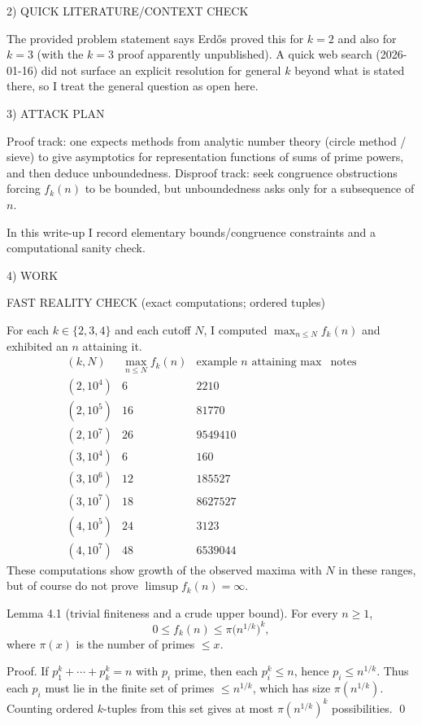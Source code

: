2) QUICK LITERATURE/CONTEXT CHECK

The provided problem statement says Erd\H{o}s proved this for $k=2$ and also for $k=3$ (with the $k=3$ proof apparently unpublished).
A quick web search (2026-01-16) did not surface an explicit resolution for general $k$ beyond what is stated there, so I treat the general question as open here.

3) ATTACK PLAN

Proof track: one expects methods from analytic number theory (circle method / sieve) to give asymptotics for representation functions of sums of prime powers, and then deduce unboundedness.
Disproof track: seek congruence obstructions forcing $f_k(n)$ to be bounded, but unboundedness asks only for a subsequence of $n$.

In this write-up I record elementary bounds/congruence constraints and a computational sanity check.

4) WORK

FAST REALITY CHECK (exact computations; ordered tuples)

For each $k\in\{2,3,4\}$ and each cutoff $N$, I computed $\max_{n\le N} f_k(n)$ and exhibited an $n$ attaining it.
\[
\begin{array}{c|c|c|c}
(k,N) & \max_{n\le N} f_k(n) & \text{example }n\text{ attaining max} & \text{notes}\\\hline
(2,10^4) & 6 & 2210 & \\
(2,10^5) & 16 & 81770 & \\
(2,10^7) & 26 & 9549410 & \\
(3,10^4) & 6 & 160 & \\
(3,10^6) & 12 & 185527 & \\
(3,10^7) & 18 & 8627527 & \\
(4,10^5) & 24 & 3123 & \\
(4,10^7) & 48 & 6539044 &
\end{array}
\]
These computations show growth of the observed maxima with $N$ in these ranges, but of course do not prove $\limsup f_k(n)=\infty$.

Lemma 4.1 (trivial finiteness and a crude upper bound).
For every $n\ge 1$,
\[
0\le f_k(n)\le \pi\bigl(n^{1/k}\bigr)^k,
\]
where $\pi(x)$ is the number of primes $\le x$.

Proof.
If $p_1^k+\cdots+p_k^k=n$ with $p_i$ prime, then each $p_i^k\le n$, hence $p_i\le n^{1/k}$.
Thus each $p_i$ must lie in the finite set of primes $\le n^{1/k}$, which has size $\pi(n^{1/k})$.
Counting ordered $k$-tuples from this set gives at most $\pi(n^{1/k})^k$ possibilities. \qed

